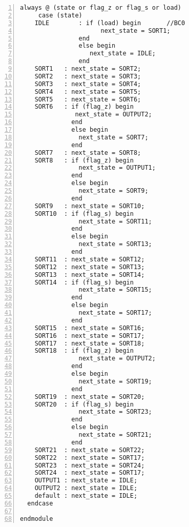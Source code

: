 \begin{lstlisting}[numbers=left,xleftmargin=1em, multicols=2,frame=leftline, basicstyle = \small\ttfamily]
   always @ (state or flag_z or flag_s or load)
     case (state)
	IDLE		: if (load) begin       //BC0
                      next_state = SORT1;
                end
                else begin
                   next_state = IDLE;
                end
	SORT1	: next_state = SORT2;
	SORT2	: next_state = SORT3;
	SORT3	: next_state = SORT4;
	SORT4	: next_state = SORT5;
    SORT5	: next_state = SORT6;
	SORT6	: if (flag_z) begin
               next_state = OUTPUT2;
              end
              else begin
                next_state = SORT7;
              end
	SORT7	: next_state = SORT8;
	SORT8	: if (flag_z) begin
				next_state = OUTPUT1;
			  end
			  else begin
				next_state = SORT9;
			  end
	SORT9	: next_state = SORT10;
	SORT10	: if (flag_s) begin
				next_state = SORT11;
			  end
			  else begin
				next_state = SORT13;
			  end
	SORT11	: next_state = SORT12;
	SORT12	: next_state = SORT13;
	SORT13	: next_state = SORT14;
	SORT14	: if (flag_s) begin
				next_state = SORT15;
			  end
			  else begin
				next_state = SORT17;
			  end
	SORT15	: next_state = SORT16;
	SORT16	: next_state = SORT17;
	SORT17	: next_state = SORT18;
	SORT18	: if (flag_z) begin
				next_state = OUTPUT2;
			  end
			  else begin
				next_state = SORT19;
			  end
	SORT19	: next_state = SORT20;
	SORT20	: if (flag_s) begin
				next_state = SORT23;
			  end
			  else begin
				next_state = SORT21;
			  end
	SORT21	: next_state = SORT22;
	SORT22	: next_state = SORT17;
	SORT23	: next_state = SORT24;
	SORT24	: next_state = SORT17;
	OUTPUT1	: next_state = IDLE;
	OUTPUT2	: next_state = IDLE;
	default	: next_state = IDLE;
  endcase

endmodule
\end{lstlisting}

